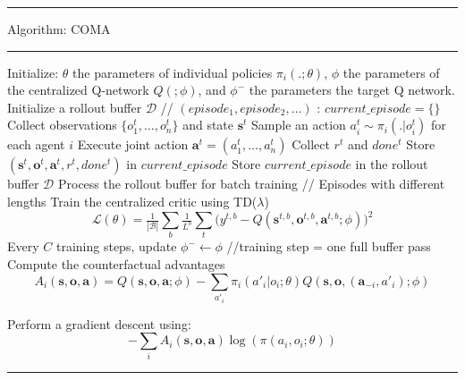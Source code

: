 \documentclass[varwidth, border=20pt]{standalone}
\begin{document}
\begingroup
\small                    
\begin{center}
  \begin{minipage}{0.99\linewidth} 
    \hrule height 0.7pt
    \vspace{3pt}
    Algorithm: COMA
    \vspace{3pt}
    \hrule height 0.7pt
    \vspace{6pt}

   
    \begin{algorithmic}[1]
      \State Initialize: $\theta$ the parameters of individual policies $\pi_i(.;\theta)$, $\phi$ the parameters of the centralized Q-network $Q(;\phi)$, and $\phi^-$ the parameters the target Q network. 
        \State Initialize a rollout buffer $\mathcal{D}$ // $(episode_1, episode_2, \dots)$
        :
            \State $current\_episode = \{ \}$ 
                \State Collect observations $\{o^t_1,\dots,o^t_n\}$ and state $\mathbf{s}^t$
                \State  Sample an action $a_i^t \sim \pi_i(.|o_i^t)$ for each agent $i$
                \State Execute joint action $\mathbf{a}^t = (a_1^t,\dots,a_n^t)$
                \State Collect $r^t$ and  $done^t$
                \State Store $(\mathbf{s}^t,\mathbf{o}^t,\mathbf{a}^t,r^t,done^t)$ in $current\_episode$
                \EndWhile
            \State Store $current\_episode$ in the rollout buffer $\mathcal{D}$
        \EndFor
        \State Process the rollout buffer for batch training // Episodes with different lengths
        \State Train the centralized critic using TD($\lambda$)
        \Statex
          \[
            \mathcal{L}(\theta)=\tfrac{1}{|\mathcal{B}|}\sum_b \tfrac{1}{L^b} \sum_t \Big(y^{t,b}- Q(\mathbf{s}^{t,b},\mathbf{o}^{t,b},\mathbf{a}^{t,b}; \phi)\Big)^2
          \]
        \State Every $C$ training steps, update $\phi^- \leftarrow \phi$ //training step = one full buffer pass
        \State Compute the counterfactual advantages
         \[
            A_i(\mathbf{s}, \mathbf{o},\mathbf{a}) = Q(\mathbf{s}, \mathbf{o},\mathbf{a};\phi) - \sum_{a'_i} \pi_i(a'_i|o_i;\theta) Q(\mathbf{s}, \mathbf{o},(\mathbf{a}_{-i},a'_i);\phi)
         \]

         \State Perform a gradient descent using:
         \[ 
             - \sum_i A_i(\mathbf{s}, \mathbf{o},\mathbf{a}) \log(\pi(a_i,o_i;\theta))
         \]

      \EndWhile
    \end{algorithmic}

    \vspace{6pt}
    \hrule height 0.7pt
  \end{minipage}
\end{center}
\endgroup
\end{document}
